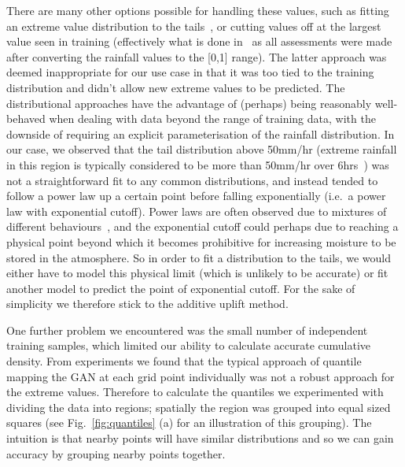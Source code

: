 \documentclass[../main.tex]{subfiles}
\begin{document}
There are many other options possible for handling these values, such as fitting an extreme value distribution to the tails~\citep{kallache_nonstationary_2011, trentini_novel_2023}, or cutting values off at the largest value seen in training (effectively what is done in~\cite{leinonen_stochastic_2020} as all assessments were made after converting the rainfall values to the [0,1] range). The latter approach was deemed inappropriate for our use case in that it was too tied to the training distribution and didn't allow new extreme values to be predicted. The distributional approaches have the advantage of (perhaps) being reasonably well-behaved when dealing with data beyond the range of training data, with the downside of requiring an explicit parameterisation of the rainfall distribution. In our case, we observed that the tail distribution above 50mm/hr (extreme rainfall in this region is typically considered to be more than 50mm/hr over 6hrs~\citep{wilson_forecast_2014}) was not a straightforward fit to any common distributions, and instead tended to follow a power law up a certain point before falling exponentially (i.e.~a power law with exponential cutoff). Power laws are often observed due to mixtures of different behaviours~\citep{cavanaugh_probability_2015}, and the exponential cutoff could perhaps due to reaching a physical point beyond which it becomes prohibitive for increasing moisture to be stored in the atmosphere. So in order to fit a distribution to the tails, we would either have to model this physical limit (which is unlikely to be accurate) or fit another model to predict the point of exponential cutoff. For the sake of simplicity we therefore stick to the additive uplift method.

One further problem we encountered was the small number of independent training samples, which limited our ability to calculate accurate cumulative density. From experiments we found that the typical approach of quantile mapping the GAN at each grid point individually was not a robust approach for the extreme values. Therefore to calculate the quantiles we experimented with dividing the data into regions; spatially the region was grouped into equal sized squares (see Fig.~\ref{fig:quantiles} (a) for an illustration of this grouping). The intuition is that nearby points will have similar distributions and so we can gain accuracy by grouping nearby points together. 
\end{document}
